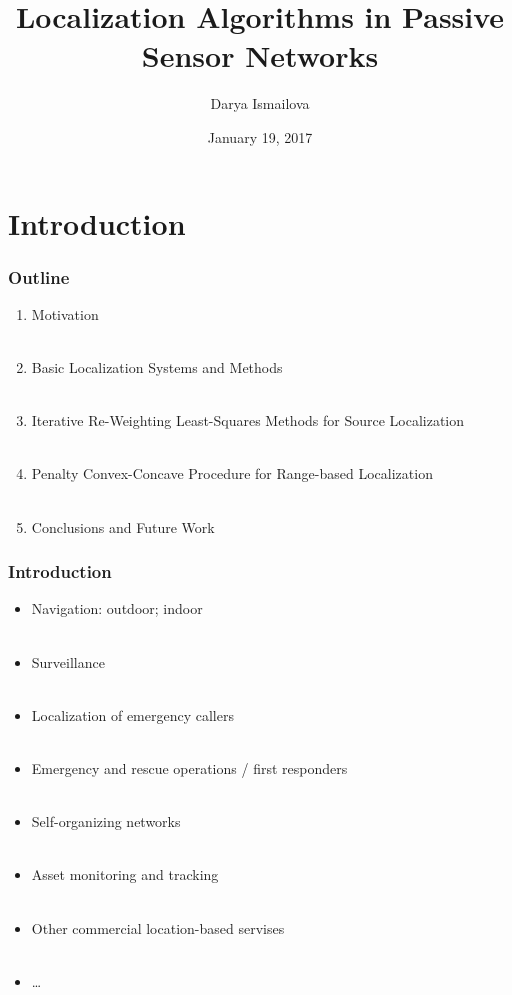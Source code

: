\documentclass [t] {beamer} %
\title[Localization in PSN]{Localization Algorithms in Passive Sensor Networks}
\author{Darya Ismailova}
\institute[UVic] 
{
Department of Electrical and Computer Engineering \\
University of Victoria, Victoria, BC, Canada \\
\medskip
}
\date{January 19, 2017}
\begin{document}
 

\begin{frame} %
\titlepage 
\end{frame}




\section{Introduction} 

\begin{frame} %
\frametitle{Outline} 
\begin{enumerate}
\item
Motivation
\\~\\
\item
Basic Localization Systems and Methods
\\~\\
\item
Iterative Re-Weighting Least-Squares Methods for Source Localization
\\~\\
\item
Penalty Convex-Concave Procedure for Range-based Localization
\\~\\
\item
Conclusions and Future Work
\end{enumerate}
\end{frame}


\begin{frame} %
\frametitle{Introduction}
\phantom{m}
\begin{itemize}
\item
Navigation: outdoor; indoor
\\~\\
\item
Surveillance
\\~\\
\item
Localization of emergency callers
\\~\\
\item
Emergency and rescue operations / first responders
\\~\\
\item
Self-organizing networks
\\~\\
\item
Asset monitoring and tracking
\\~\\
\item
Other commercial location-based servises
\\~\\
\item
\ldots
\end{itemize}
\end{frame}
\end{document}
